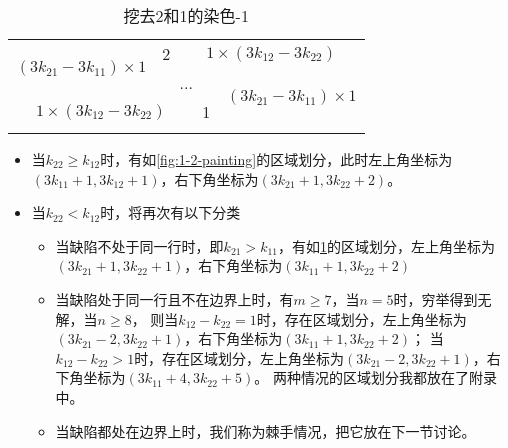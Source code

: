 \begin{table}[t]
	\centering
	\caption{挖去2和1的染色-1}
	\begin{tabular}{|cc|ccc|cc|}
		\hline
		\multicolumn{2}{|c|}{\multirow{3}{*}{$(3k_{21} - 3k_{11}) \times 1$}} & 2 & \multicolumn{4}{|c|}{$1 \times  (3k_{12} - 3k_{22})$}                                                                                 \\
		\cline{3-7}
		                                                                      &   & \multicolumn{3}{|c|}{\multirow{2}{*}{...}}            & \multicolumn{2}{|c|}{\multirow{3}{*}{$(3k_{21} - 3k_{11}) \times 1$}}         \\
		                                                                      &   &                                                       &                                                                       &  &  & \\
		\cline{1-5}
		\multicolumn{4}{|c|}{$1 \times  (3k_{12} - 3k_{22})$}                 & 1 &                                                       &                                                                               \\
		\hline
		\label{fig:2-1-painting-1}
	\end{tabular}
\end{table}

\begin{itemize}
	\item 当$k_{22} \ge k_{12}$时，有如\ref*{fig:1-2-painting}的区域划分，此时左上角坐标为$(3k_{11} + 1, 3k_{12} + 1)$，右下角坐标为$(3k_{21} + 1, 3k_{22} + 2)$。
	\item 当$k_{22} < k_{12}$时，将再次有以下分类
	      \begin{itemize}
		      \item 当缺陷不处于同一行时，即$k_{21} > k_{11}$，有如\ref*{fig:2-1-painting-1}的区域划分，左上角坐标为$(3k_{21} + 1, 3k_{22} + 1)$，右下角坐标为$(3k_{11} + 1, 3k_{22} + 2)$
		      \item 当缺陷处于同一行且不在边界上时，有$m \ge 7$，当$n = 5$时，穷举得到无解，当$n \ge 8$，
		            则当$k_{12} - k_{22} = 1$时，存在区域划分，左上角坐标为$(3k_{21}- 2, 3k_{22} + 1)$，右下角坐标为$(3k_{11} + 1, 3k_{22} + 2)$；
		            当$k_{12} - k_{22} > 1$时，存在区域划分，左上角坐标为$(3k_{21} - 2, 3k_{22} + 1)$，右下角坐标为$(3k_{11} + 4, 3k_{22} + 5)$。
		            两种情况的区域划分我都放在了附录中。
		      \item 当缺陷都处在边界上时，我们称为棘手情况，把它放在下一节讨论。
	      \end{itemize}
\end{itemize}




